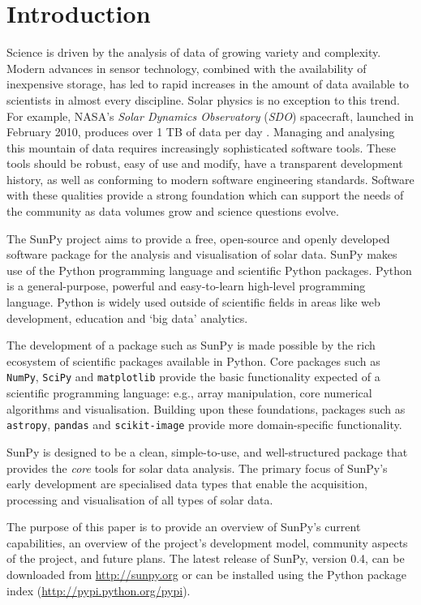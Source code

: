 \section{Introduction}\label{sec:Intro}

Science is driven by the analysis of data of growing variety and complexity.
Modern advances in sensor
technology, combined with the availability of inexpensive storage, has led to
rapid increases in the amount of data available to scientists in almost
every discipline.  Solar physics is no exception to this trend. For example,
NASA's \textit{Solar Dynamics Observatory} (\textit{SDO}) spacecraft, launched 
in February 2010, produces over 1 TB of data per day \citep{aia}. Managing and
analysing this mountain of data requires increasingly sophisticated software 
tools.
These tools should be robust, easy of use and modify, have a transparent 
development history, as well as conforming to modern software engineering 
standards.
Software with these qualities provide a strong foundation which can support the 
needs of the community as data volumes grow and science questions evolve.

The SunPy project aims to provide a free, open-source and openly developed 
software package for the analysis and visualisation of solar data. SunPy makes 
use of the Python programming language and scientific Python packages. Python 
is a general-purpose, powerful and easy-to-learn high-level programming 
language.
Python is widely used outside of scientific fields in areas like web development, 
education and `big data' analytics.

The development of a package such as SunPy is made possible by the 
rich ecosystem of scientific packages available in Python. Core packages such 
as \texttt{NumPy}, \texttt{SciPy} and \texttt{matplotlib} 
provide the basic functionality expected of a scientific programming language:
e.g., array manipulation, core numerical algorithms and visualisation. 
Building upon these foundations, packages such as \texttt{astropy}, \texttt{pandas} and 
\texttt{scikit-image} provide more domain-specific functionality.

SunPy is designed to be a clean, simple-to-use, and well-structured 
package that provides the \textit{core} tools for solar data analysis. 
The primary focus of SunPy's early development are 
specialised data types that enable the acquisition, processing and 
visualisation of all types of solar data.

The purpose of this paper is to provide an overview of SunPy's current 
capabilities, an overview of the project's development model, community aspects of the 
project, and future plans. The latest release of SunPy, version 0.4,
can be downloaded from \url{http://sunpy.org} or can be
installed using the Python package index (\url{http://pypi.python.org/pypi}).

